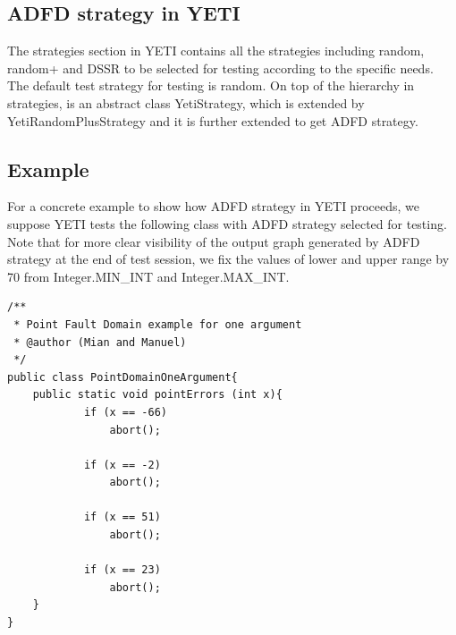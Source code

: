  \subsection{ADFD strategy in YETI}
The strategies section in YETI contains all the strategies including random, random+ and DSSR to be selected for testing according to the specific needs. The default test strategy for testing is random. On top of the hierarchy in strategies, is an abstract class YetiStrategy, which is extended by YetiRandomPlusStrategy and it is further extended to get ADFD strategy.
 

\subsection{Example}\label{sec:example}
For a concrete example to show how ADFD strategy in YETI proceeds, we suppose YETI tests the following class with ADFD strategy selected for testing. Note that for more clear visibility of the output graph generated by ADFD strategy at the end of test session, we fix the values of lower and upper range by 70 from Integer.MIN\_INT and Integer.MAX\_INT. 

\begin{lstlisting}
/**
 * Point Fault Domain example for one argument
 * @author (Mian and Manuel)
 */
public class PointDomainOneArgument{
	public static void pointErrors (int x){
     		if (x == -66)
       			abort();
     
     		if (x == -2)
     			abort();
      				
     		if (x == 51)
     			abort();
     
     		if (x == 23)
     			abort();
	}
}
\end{lstlisting}


